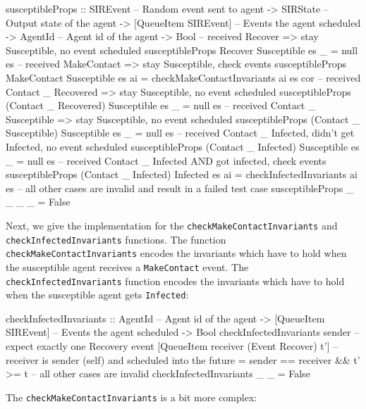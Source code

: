 \begin{HaskellCode}
susceptibleProps :: SIREvent              -- Random event sent to agent
                 -> SIRState              -- Output state of the agent
                 -> [QueueItem SIREvent]  -- Events the agent scheduled
                 -> AgentId               -- Agent id of the agent
                 -> Bool
-- received Recover => stay Susceptible, no event scheduled
susceptibleProps Recover Susceptible es _ = null es
-- received MakeContact => stay Susceptible, check events
susceptibleProps MakeContact Susceptible es ai
  = checkMakeContactInvariants ai es cor 
-- received Contact _ Recovered => stay Susceptible, no event scheduled
susceptibleProps (Contact _ Recovered) Susceptible es _ = null es
-- received Contact _ Susceptible => stay Susceptible, no event scheduled
susceptibleProps (Contact _ Susceptible) Susceptible es _  = null es
-- received Contact _ Infected, didn't get Infected, no event scheduled
susceptibleProps (Contact _ Infected) Susceptible es _ = null es
-- received Contact _ Infected AND got infected, check events
susceptibleProps (Contact _ Infected) Infected es ai
  = checkInfectedInvariants ai es
-- all other cases are invalid and result in a failed test case
susceptibleProps _ _ _ _ = False
\end{HaskellCode}

Next, we give the implementation for the \texttt{checkMakeContactInvariants} and \texttt{checkInfectedInvariants} functions. The function \\ \texttt{checkMakeContactInvariants} encodes the invariants which have to hold when the susceptible agent receives a \texttt{MakeContact} event. The \\ \texttt{checkInfectedInvariants} function encodes the invariants which have to hold when the susceptible agent gets \texttt{Infected}:

\begin{HaskellCode}
checkInfectedInvariants :: AgentId              -- Agent id of the agent 
                        -> [QueueItem SIREvent] -- Events the agent scheduled
                        -> Bool
checkInfectedInvariants sender 
  -- expect exactly one Recovery event
  [QueueItem receiver (Event Recover) t'] 
  -- receiver is sender (self) and scheduled into the future
  = sender == receiver && t' >= t 
-- all other cases are invalid
checkInfectedInvariants _ _ = False
\end{HaskellCode}

The \texttt{checkMakeContactInvariants} is a bit more complex:

